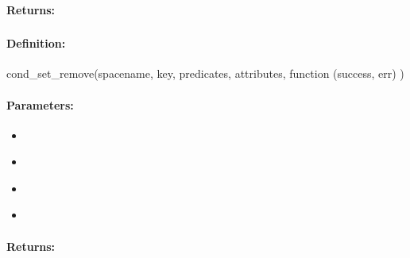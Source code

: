 \paragraph{Returns:}


\pagebreak
\subsubsection{}
\label{api:nodejs:cond_set_remove}


\paragraph{Definition:}
\begin{javascriptcode}
cond_set_remove(spacename, key, predicates, attributes, function (success, err) {})
\end{javascriptcode}
\paragraph{Parameters:}
\begin{itemize}[noitemsep]
\item {}\\

\item {}\\

\item {}\\

\item {}\\

\end{itemize}

\paragraph{Returns:}


\pagebreak
\subsubsection{}
\label{api:nodejs:set_intersect}


